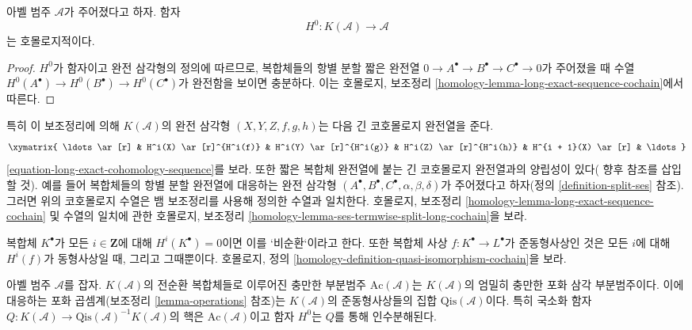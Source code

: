 \begin{lemma}
\label{lemma-cohomology-homological}
아벨 범주 $\mathcal{A}$가 주어졌다고 하자. 함자
$$
H^0 : K(\mathcal{A}) \longrightarrow \mathcal{A}
$$
는 호몰로지적이다.
\end{lemma}

\begin{proof}
$H^0$가 함자이고 완전 삼각형의 정의에 따르므로, 복합체들의 항별 분할
짧은 완전열
$0 \to A^\bullet \to B^\bullet \to C^\bullet \to 0$가 주어졌을 때
수열 $H^0(A^\bullet) \to H^0(B^\bullet) \to H^0(C^\bullet)$가
완전함을 보이면 충분하다. 이는 호몰로지, 보조정리
\ref{homology-lemma-long-exact-sequence-cochain}에서 따른다.
\end{proof}

\noindent
특히 이 보조정리에 의해 $K(\mathcal{A})$의 완전 삼각형
$(X, Y, Z, f, g, h)$는 다음 긴 코호몰로지 완전열을 준다.
\begin{equation}
\label{equation-long-exact-cohomology-sequence-D}
\xymatrix{
\ldots \ar[r] &
H^i(X) \ar[r]^{H^i(f)} &
H^i(Y) \ar[r]^{H^i(g)} &
H^i(Z) \ar[r]^{H^i(h)} &
H^{i + 1}(X) \ar[r] & \ldots
}
\end{equation}
\ref{equation-long-exact-cohomology-sequence}를 보라. 또한 짧은
복합체 완전열에 붙는 긴 코호몰로지 완전열과의 양립성이 있다(
향후 참조를 삽입할 것). 예를 들어 복합체들의 항별 분할 완전열에 대응하는 완전 삼각형
$(A^\bullet, B^\bullet, C^\bullet, \alpha, \beta, \delta)$가
주어졌다고 하자(정의 \ref{definition-split-ses} 참조). 그러면 위의
코호몰로지 수열은 뱀 보조정리를 사용해 정의한 수열과 일치한다. 호몰로지,
보조정리 \ref{homology-lemma-long-exact-sequence-cochain} 및 수열의
일치에 관한 호몰로지, 보조정리
\ref{homology-lemma-ses-termwise-split-long-cochain}을 보라.

\medskip\noindent
복합체 $K^\bullet$가 모든 $i \in \mathbf{Z}$에 대해
$H^i(K^\bullet) = 0$이면 이를 {`}비순환{`}이라고 한다. 또한 복합체
사상 $f : K^\bullet \to L^\bullet$가 준동형사상인 것은 모든 $i$에 대해
$H^i(f)$가 동형사상일 때, 그리고 그때뿐이다. 호몰로지, 정의
\ref{homology-definition-quasi-isomorphism-cochain}을 보라.

\begin{lemma}
\label{lemma-acyclic}
아벨 범주 $\mathcal{A}$를 잡자. $K(\mathcal{A})$의 전순환 복합체들로
이루어진 충만한 부분범주
$\text{Ac}(\mathcal{A})$는 $K(\mathcal{A})$의 엄밀히 충만한 포화 삼각
부분범주이다. 이에 대응하는 포화 곱셈계(보조정리
\ref{lemma-operations} 참조)는 $K(\mathcal{A})$의 준동형사상들의 집합
$\text{Qis}(\mathcal{A})$이다. 특히 국소화 함자
$Q : K(\mathcal{A}) \to \text{Qis}(\mathcal{A})^{-1}K(\mathcal{A})$의
핵은 $\text{Ac}(\mathcal{A})$이고 함자 $H^0$는 $Q$를 통해 인수분해된다.
\end{lemma}

